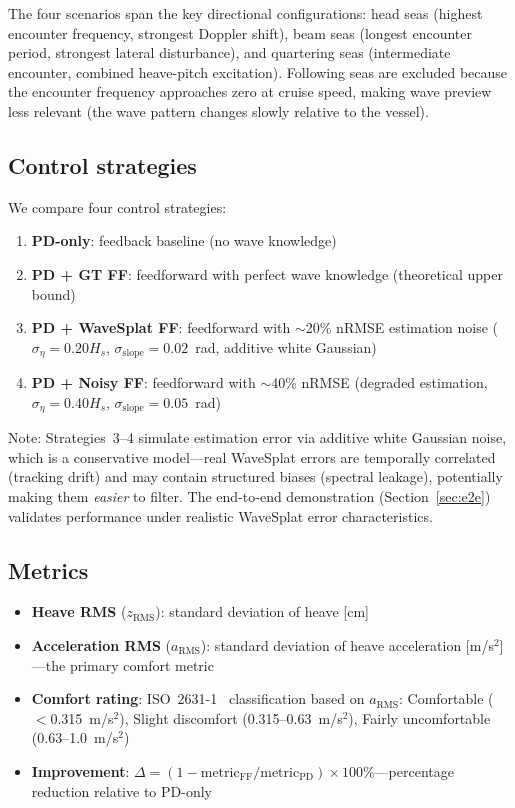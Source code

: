 \documentclass[review]{elsarticle}
\begin{document}
The four scenarios span the key directional configurations:
head seas (highest encounter frequency, strongest Doppler shift),
beam seas (longest encounter period, strongest lateral disturbance),
and quartering seas (intermediate encounter, combined heave-pitch
excitation).
Following seas are excluded because the encounter frequency
approaches zero at cruise speed, making wave preview less
relevant (the wave pattern changes slowly relative to the vessel).

\subsection{Control strategies}

We compare four control strategies:
\begin{enumerate}
  \item \textbf{PD-only}: feedback baseline (no wave knowledge)
  \item \textbf{PD + GT FF}: feedforward with perfect wave knowledge
    (theoretical upper bound)
  \item \textbf{PD + WaveSplat FF}: feedforward with $\sim$20\% nRMSE
    estimation noise ($\sigma_\eta = 0.20 H_s$,
    $\sigma_{\text{slope}} = 0.02$~rad, additive white Gaussian)
  \item \textbf{PD + Noisy FF}: feedforward with $\sim$40\% nRMSE
    (degraded estimation, $\sigma_\eta = 0.40 H_s$,
    $\sigma_{\text{slope}} = 0.05$~rad)
\end{enumerate}

Note: Strategies~3--4 simulate estimation error via additive white
Gaussian noise, which is a conservative model---real WaveSplat
errors are temporally correlated (tracking drift) and may contain
structured biases (spectral leakage), potentially making them
\emph{easier} to filter.
The end-to-end demonstration (Section~\ref{sec:e2e}) validates
performance under realistic WaveSplat error characteristics.

\subsection{Metrics}

\begin{itemize}
  \item \textbf{Heave RMS} ($z_\text{RMS}$): standard deviation of heave [cm]
  \item \textbf{Acceleration RMS} ($a_\text{RMS}$): standard deviation of heave
    acceleration [m/s$^2$]---the primary comfort metric
  \item \textbf{Comfort rating}: ISO~2631-1~\citep{iso2631} classification
    based on $a_\text{RMS}$:
    Comfortable ($<$0.315~m/s$^2$),
    Slight discomfort (0.315--0.63~m/s$^2$),
    Fairly uncomfortable (0.63--1.0~m/s$^2$)
  \item \textbf{Improvement}: $\Delta = (1 - \text{metric}_\text{FF} / \text{metric}_\text{PD}) \times 100\%$---percentage reduction relative to PD-only
\end{itemize}
\end{document}
